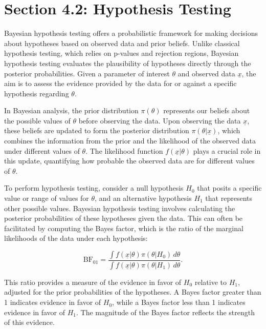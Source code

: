 \section{Section 4.2: Hypothesis Testing}

Bayesian hypothesis testing offers a probabilistic framework for making decisions about hypotheses based on observed data and prior beliefs. Unlike classical hypothesis testing, which relies on p-values and rejection regions, Bayesian hypothesis testing evaluates the plausibility of hypotheses directly through the posterior probabilities. Given a parameter of interest $\theta$ and observed data $\underline{x}$, the aim is to assess the evidence provided by the data for or against a specific hypothesis regarding $\theta$.

In Bayesian analysis, the prior distribution $\pi(\theta)$ represents our beliefs about the possible values of $\theta$ before observing the data. Upon observing the data $\underline{x}$, these beliefs are updated to form the posterior distribution $\pi(\theta|\underline{x})$, which combines the information from the prior and the likelihood of the observed data under different values of $\theta$. The likelihood function $f(\underline{x}|\theta)$ plays a crucial role in this update, quantifying how probable the observed data are for different values of $\theta$.

To perform hypothesis testing, consider a null hypothesis $H_0$ that posits a specific value or range of values for $\theta$, and an alternative hypothesis $H_1$ that represents other possible values. Bayesian hypothesis testing involves calculating the posterior probabilities of these hypotheses given the data. This can often be facilitated by computing the Bayes factor, which is the ratio of the marginal likelihoods of the data under each hypothesis:

\begin{equation*}
\text{BF}_{01} = \frac{\int f(\underline{x}|\theta) \pi(\theta|H_0)\,d\theta}{\int f(\underline{x}|\theta) \pi(\theta|H_1)\,d\theta}.
\end{equation*}

This ratio provides a measure of the evidence in favor of $H_0$ relative to $H_1$, adjusted for the prior probabilities of the hypotheses. A Bayes factor greater than 1 indicates evidence in favor of $H_0$, while a Bayes factor less than 1 indicates evidence in favor of $H_1$. The magnitude of the Bayes factor reflects the strength of this evidence.

